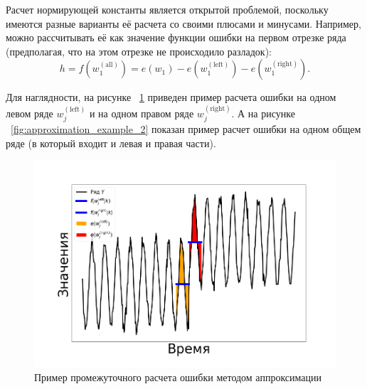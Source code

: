 \documentclass[%
12pt,
master,  %
natbib,      %
subf,        %
substylefile = spbu.rtx,
href,        %
colorlinks,  %
]{disser}
\begin{document}

Расчет нормирующей константы является открытой проблемой, поскольку имеются разные варианты её расчета со своими плюсами и минусами.
Например, можно рассчитывать её как значение функции ошибки на первом отрезке ряда (предполагая, что на этом отрезке не происходило разладок):
\begin{equation*} 
h = f(w_1^{\mathrm{(all)}}) = e(w_1) - e(w_1^{\mathrm{(left)}}) - e(w_1^{\mathrm{(right)}}). 
\end{equation*}

Для наглядности, на рисунке ~\ref{fig:approximation_example_1} приведен пример расчета ошибки на одном левом ряде $ w_j^{\mathrm{(left)}} $ и на одном правом ряде $ w_j^{\mathrm{(right)}} $. А на рисунке ~\ref{fig:approximation_example_2} показан пример расчет ошибки на одном общем ряде (в который входит и левая и правая части).


\begin{figure}[!hhh]
	\begin{center}
		\includegraphics[width=12cm]{approaches_second_2_ru}
	\end{center}
	\vspace{-5mm}\caption{Пример промежуточного расчета ошибки методом аппроксимации}
	\label{fig:approximation_example_1}
\end{figure}
\end{document}
